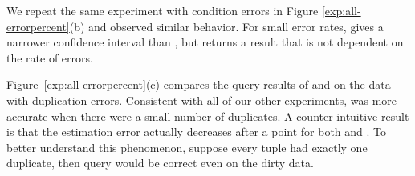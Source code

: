 


We repeat the same experiment with condition errors in Figure \ref{exp:all-errorpercent}(b) and observed similar behavior.
For small error rates, \bias gives a narrower confidence interval than \sampleclean, but \sampleclean returns a result that is not dependent on the rate of errors.


Figure~\ref{exp:all-errorpercent}(c) compares the \avgfunc query results of \sampleclean and \biascorrected on the data with duplication errors.
Consistent with all of our other experiments, \bias was more accurate when there were a small number of duplicates.
A counter-intuitive result is that the estimation error actually decreases after a point for both \sampleclean and \bias.
To better understand this phenomenon, suppose every tuple had exactly one duplicate, then \avgfunc query would be correct even on the dirty data.








